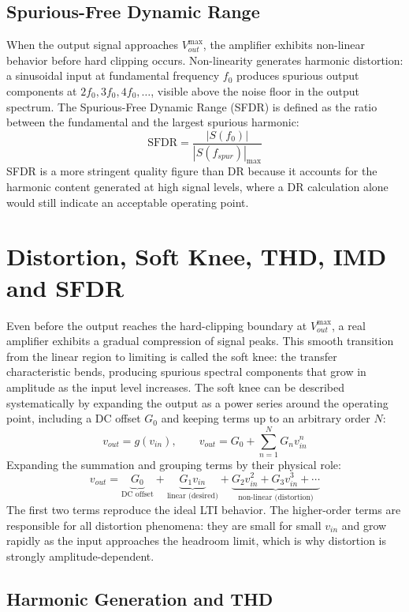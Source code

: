\subsection{Spurious-Free Dynamic Range}

When the output signal approaches \( V_{out}^{\max} \), the amplifier exhibits non-linear behavior before hard clipping occurs. Non-linearity generates harmonic distortion: a sinusoidal input at fundamental frequency \( f_0 \) produces spurious output components at \( 2f_0, 3f_0, 4f_0,\ldots \), visible above the noise floor in the output spectrum. The Spurious-Free Dynamic Range (SFDR) is defined as the ratio between the fundamental and the largest spurious harmonic:
\[
\mathrm{SFDR} = \frac{|S(f_0)|}{|S(f_{spur})|_{\max}}
\]
SFDR is a more stringent quality figure than DR because it accounts for the harmonic content generated at high signal levels, where a DR calculation alone would still indicate an acceptable operating point.

\section{Distortion, Soft Knee, THD, IMD and SFDR}

Even before the output reaches the hard-clipping boundary at \( V_{out}^{\max} \), a real amplifier exhibits a gradual compression of signal peaks. This smooth transition from the linear region to limiting is called the soft knee: the transfer characteristic bends, producing spurious spectral components that grow in amplitude as the input level increases. The soft knee can be described systematically by expanding the output as a power series around the operating point, including a DC offset \( G_0 \) and keeping terms up to an arbitrary order \( N \):
\[
v_{out} = g(v_{in}),
\qquad
v_{out} = G_0 + \sum_{n=1}^{N} G_n   v_{in}^{n}
\]
Expanding the summation and grouping terms by their physical role:
\[
v_{out} = \underbrace{G_0}_{\text{DC offset}}
        + \underbrace{G_1 v_{in}}_{\text{linear (desired)}}
        + \underbrace{G_2 v_{in}^{2} + G_3 v_{in}^{3} + \cdots}_{\text{non-linear (distortion)}}
\]
The first two terms reproduce the ideal LTI behavior. The higher-order terms are responsible for all distortion phenomena: they are small for small \( v_{in} \) and grow rapidly as the input approaches the headroom limit, which is why distortion is strongly amplitude-dependent.

\subsection{Harmonic Generation and THD}

